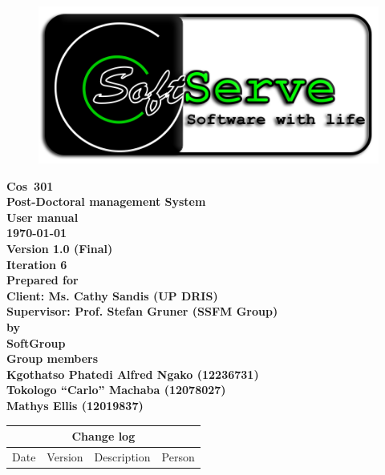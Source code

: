 \documentclass[12pt]{article}
\newcommand{\Title}{User manual} %
\newcommand{\Class}{Cos\ 301} %
\newcommand{\ssr}{Soft\color{green}{Serve }\color{black}}
\newcommand{\version}{1.0 (Final)}
\newcommand{\iteration}{6}
\newcommand{\client}{Ms. Cathy Sandis (UP DRIS)}
\newcommand{\supervisor}{Prof. Stefan Gruner (SSFM Group)}
\newcommand{\project}{Post-Doctoral management System}
\begin{document}
\vspace{4em}

\begin{center}%

\begin{figure}[ht!]
\centering
\includegraphics{../Images_Docs/logo.png}
\end{figure}
\LARGE \bf \Class \\[0.25em]
\LARGE \bf \project \\[1em]
\LARGE \bf \Title \\[0.25em]
\large \bf \today\\
\bf Version \version\\
\bf Iteration \iteration\\[0.5em]
\Large \bf Prepared for \\Client: \client\\Supervisor: \supervisor
\Large \\\bf by \\
\Large {\bf \ssr Group }\\[0.5em]
\LARGE {\bf Group members}\\[0.25em]
\large
Kgothatso Phatedi Alfred Ngako (12236731) \\[0.5em]
Tokologo “Carlo” Machaba (12078027) \\[0.5em]
Mathys Ellis (12019837) \\[8em]

\end{center}%


\begin{center}
\begin{tabular}{|l|p{1.4cm}|p{8cm}|p{2.8cm}|}
\hline
\multicolumn{4}{|c|}{\bf Change log} \\
\hline
 Date & Version & Description &  Person \\
\hline


\end{tabular}
\end{center}
\newpage
\tableofcontents
\end{document}

